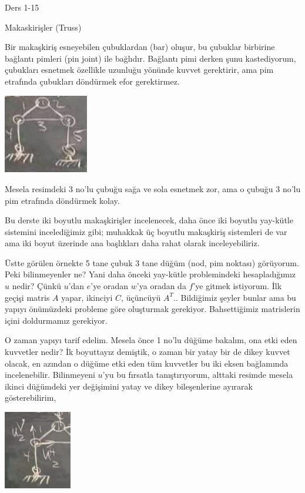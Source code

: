 \documentclass[12pt,fleqn]{article}\usepackage{../../common}
\begin{document}
Ders 1-15

Makaskirişler (Truss)

Bir makaşkiriş esneyebilen çubuklardan (bar) oluşur, bu çubuklar birbirine
bağlantı pimleri (pin joint) ile bağlıdır. Bağlantı pimi derken şunu
kastediyorum, çubukları esnetmek özellikle uzunluğu yönünde kuvvet gerektirir,
ama pim etrafında çubukları döndürmek efor gerektirmez.

\includegraphics[width=10em]{compscieng_1_15_01.png}

Mesela resimdeki 3 no'lu çubuğu sağa ve sola esnetmek zor, ama o çubuğu
3 no'lu pim etrafında döndürmek kolay.

Bu derste iki boyutlu makaşkirişler incelenecek, daha önce iki boyutlu yay-kütle
sistemini incelediğimiz gibi; muhakkak üç boyutlu makaşkiriş sistemleri de var
ama iki boyut üzerinde ana başlıkları daha rahat olarak inceleyebiliriz.

Üstte görülen örnekte 5 tane çubuk 3 tane düğüm (nod, pim noktası) görüyorum.
Peki bilinmeyenler ne? Yani daha önceki yay-kütle problemindeki hesapladığımız
$u$ nedir? Çünkü $u$'dan $e$'ye oradan $w$'ya oradan da $f$'ye gitmek
istiyorum. İlk geçişi matris $A$ yapar, ikinciyi $C$, üçüncüyü $A^T$..
Bildiğimiz şeyler bunlar ama bu yapıyı önümüzdeki probleme göre oluşturmak
gerekiyor. Bahsettiğimiz matrislerin içini doldurmamız gerekiyor.

O zaman yapıyı tarif edelim. Mesela önce 1 no'lu düğüme bakalım, ona etki eden
kuvvetler nedir? İk boyuttayız demiştik, o zaman bir yatay bir de dikey kuvvet
olacak, en azından o düğüme etki eden tüm kuvvetler bu iki eksen bağlamında
incelenebilir. Bilinmeyeni $u$'yu bu fırsatla tanıştırıyorum, alttaki resimde
mesela ikinci düğümdeki yer değişimini yatay ve dikey bileşenlerine ayırarak
gösterebilirim,

\includegraphics[width=8em]{compscieng_1_15_02.png}
\end{document}
